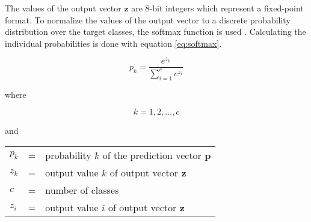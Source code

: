 The values of the output vector $\boldsymbol{z}$ are 8-bit integers which represent a fixed-point format.
To normalize the values of the output vector to a discrete probability distribution over the target classes, the softmax function is used \cite{}. %
Calculating the individual probabilities is done with equation \ref{eq:softmax}.

\begin{equation}
  p_k = \frac{e^{z_k}}{\sum\limits_{i=1}^{c} e^{z_i}}
  \label{eq:softmax}
\end{equation}

where

\[
  k = 1, 2, \dots, c
\]

and

\begin{tabular}{lll}
  $p_k$ & = & probability $k$ of the prediction vector $\boldsymbol{p}$ \\
  $z_k$ & = & output value $k$ of output vector $\boldsymbol{z}$ \\
  $c$ & = & number of classes \\
  $z_i$ & = & output value $i$ of output vector $\boldsymbol{z}$ \\
\end{tabular}
\\

